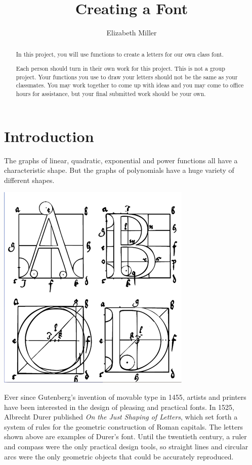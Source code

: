 \documentclass{ximera}
\author{Elizabeth Miller}
\title{Creating a Font}
\begin{document}
\begin{abstract}
  In this project, you will use functions to create a letters for our own class font.  

Each person should turn in their own work for this project.   This is not a group project.  Your functions you use to draw your letters should not be the same as your classmates.  You may work together to come up with ideas and you may come to office hours for assistance, but your final submitted work should be your own.
\end{abstract}
\licenseY
\maketitle




\section{Introduction}

The graphs of linear, quadratic, exponential and power functions all have a characteristic shape. But the graphs of polynomials have a huge variety of different shapes.

\begin{image}
\includegraphics[width=.6\textwidth]{Durer-font.png}
\end{image}

Ever since Gutenberg's invention of movable type in 1455, artists and printers have been interested in the design of pleasing and practical fonts. In 1525, Albrecht Durer published \textit{On the Just Shaping of Letters}, which set forth a system of rules for the geometric construction of Roman capitals. The letters shown above are examples of Durer's font. Until the twentieth century, a ruler and compass were the only practical design tools, so straight lines and circular arcs were the only geometric objects that could be accurately reproduced.
\end{document}
